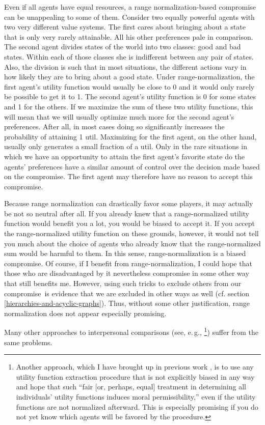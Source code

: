 Even if all agents have equal resources, a range normalization-based
compromise can be unappealing to some of them. Consider two equally
powerful agents with two very different value systems. The first cares
about bringing about a state that is only very rarely attainable. All
his other preferences pale in comparison. The second agent divides
states of the world into two classes: good and bad states. Within each
of those classes she is indifferent between any pair of states. Also,
the division is such that in most situations, the different actions vary
in how likely they are to bring about a good state. Under
range-normalization, the first agent's utility function would usually be
close to 0 and it would only rarely be possible to get it to 1. The
second agent's utility function is 0 for some states and 1 for the
others. If we maximize the sum of these two utility functions, this will
mean that we will usually optimize much more for the second agent's
preferences. After all, in most cases doing so significantly increases
the probability of attaining 1 util. Maximizing for the first agent, on
the other hand, usually only generates a small fraction of a util. Only
in the rare situations in which we have an opportunity to attain the
first agent's favorite state do the agents' preferences have a similar
amount of control over the decision made based on the compromise. The
first agent may therefore have no reason to accept this compromise.

Because range normalization can drastically favor some players, it may
actually be not so neutral after all. If you already knew that a range-normalized utility function would benefit you a lot, you would be
biased to accept it. If you accept the range-normalized utility function
on these grounds, however, it would not tell you much about the choice
of agents who already know that the range-normalized sum would be
harmful to them. In this sense, range-normalization is a biased
compromise. Of course, if I benefit from range-normalization, I could
hope that those who are disadvantaged by it nevertheless compromise in
some other way that still benefits me. However, using such tricks to
exclude others from our compromise~is evidence that we are excluded in
other ways as well (cf. section
\ref{hierarchies-and-acyclic-graphs}). Thus, without some other justification, range
normalization does not appear especially promising.

Many other approaches to interpersonal comparisons (see, e.\,g.,
\cite{Sen2014-ns}\footnote{Another approach, which I
  have brought up in previous work
  \citeyear{Oesterheld2016-pq}, is to use any utility
  function extraction procedure that is not explicitly biased in any way
  and hope that such ``fair {[}or, perhaps, equal{]} treatment in
  determining all individuals' utility functions induces moral
  permissibility,'' even if the utility functions are not normalized
  afterward. This is especially promising if you do not yet know which
  agents will be favored by the procedure.}) suffer from the same
problems.

